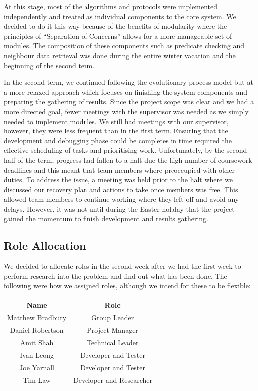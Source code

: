 At this stage, most of the algorithms and protocols were implemented independently and treated as individual components to the core system. We decided to do it this way because of the benefits of modularity where the principles of ``Separation of Concerns'' \cite{?} allows for a more manageable set of modules. The composition of these components such as predicate checking and neighbour data retrieval was done during the entire winter vacation and the beginning of the second term.

In the second term, we continued following the evolutionary process model but at a more relaxed approach which focuses on finishing the system components and preparing the gathering of results. Since the project scope was clear and we had a more directed goal, fewer meetings with the supervisor was needed as we simply needed to implement modules. We still had meetings with our supervisor, however, they were less frequent than in the first term. Ensuring that the development and debugging phase could be completes in time required the effective scheduling of tasks and prioritising work. Unfortunately, by the second half of the term, progress had fallen to a halt due the high number of coursework deadlines and this meant that team members where preoccupied with other duties. To address the issue, a meeting was held prior to the halt where we discussed our recovery plan and actions to take once members was free. This allowed team members to continue working where they left off and avoid any delays. However, it was not until during the Easter holiday that the project gained the momentum to finish development and results gathering.

\subsection{Role Allocation}

We decided to allocate roles in the second week after we had the first week to perform research into the problem and find out what has been done. The following were how we assigned roles, although we intend for these to be flexible:

\begin{table}[H]
\centering
	\begin{tabular}{| c | c |}
		\hline
		Name & Role\\
		\hline
		Matthew Bradbury & Group Leader\\
		Daniel Robertson & Project Manager\\
		Amit Shah & Technical Leader\\
		Ivan Leong & Developer and Tester\\
		Joe Yarnall & Developer and Tester\\
		Tim Law & Developer and Researcher\\
		\hline
	\end{tabular}
\end{table}

